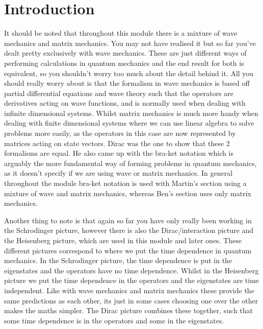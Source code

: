 \documentclass[
11pt, %
oneside, %
english, %
onehalfspacing, %
]{McMasterThesis} %
\begin{document}
\section*{\Huge Introduction} 
It should be noted that throughout this module there is a mixture of wave mechanics and matrix mechanics. You may not have realised it but so far you've dealt pretty exclusively with wave mechanics. These are just different ways of performing calculations in quantum mechanics and the end result for both is equivalent, so you shouldn't worry too much about the detail behind it. All you should really worry about is that the formalism in wave mechanics is based off partial differential equations and wave theory such that the operators are derivatives acting on wave functions, and is normally used when dealing with infinite dimensional systems. Whilst matrix mechanics is much more handy when dealing with finite dimensional systems where we can use linear algebra to solve problems more easily, as the operators in this case are now represented by matrices acting on state vectors. Dirac was the one to show that these 2 formalisms are equal. He also came up with the bra-ket notation which is arguably the more fundamental way of forming problems in quantum mechanics, as it doesn't specify if we are using wave or matrix mechanics. In general throughout the module bra-ket notation is used with Martin's section using a mixture of wave and matrix mechanics, whereas Ben's section uses only matrix mechanics.

\noindent Another thing to note is that again so far you have only really been working in the Schrodinger picture, however there is also the Dirac/interaction picture and the Heisenberg picture, which are used in this module and later ones. These different pictures correspond to where we put the time dependence in quantum mechanics. In the Schrodinger picture, the time dependence is put in the eigenstates and the operators have no time dependence. Whilst in the Heisenberg picture we put the time dependence in the operators and the eigenstates are time independent. Like with wave mechanics and matrix mechanics these provide the same predictions as each other, its just in some cases choosing one over the other makes the maths simpler. The Dirac picture combines these together, such that some time dependence is in the operators and some in the eigenstates. 
\end{document}
